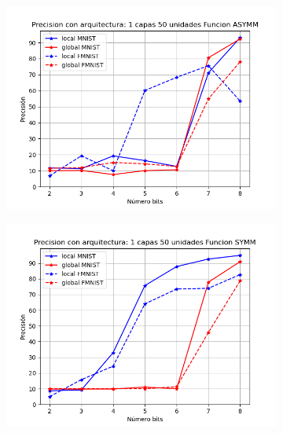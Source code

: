 \begin{figure}[H]
    \centering
    \begin{subfigure}[H]{0.475\textwidth}
    \includegraphics[width=\textwidth]{imagenes/fa/Precision con arquitectura: 1 capas 50 unidades Funcion ASYMM.png}
    \end{subfigure}
    \begin{subfigure}[H]{0.475\textwidth}
    \includegraphics[width=\textwidth]{imagenes/fa/Precision con arquitectura: 1 capas 50 unidades Funcion SYMM.png}
    \end{subfigure}
    \begin{subfigure}[H]{0.475\textwidth}

\end{subfigure}
\end{figure}
